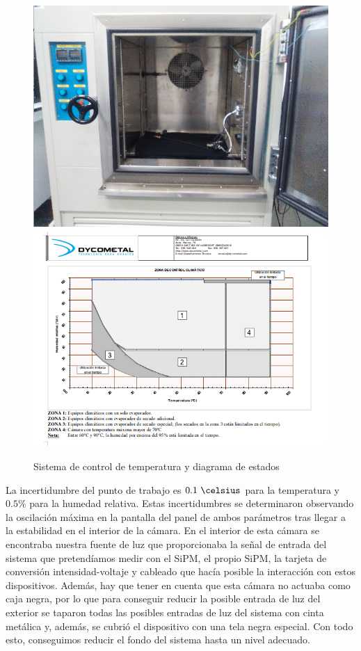 \begin{enumerate}
\begin{figure}[htb]
\centering
{
\includegraphics[scale=0.3]{InteriorTemperatura.png} 
}
{
\includegraphics[scale=0.3]{FichaTecnica.png} 
}
\caption{Sistema de control de temperatura y diagrama de estados~\cite{dycometal}\label{sistematemperatura}}
\end{figure}

La incertidumbre  del punto de trabajo es $0.1~\celsius$ para la temperatura y $0.5\%$ para la humedad relativa. Estas incertidumbres se determinaron observando la oscilación  máxima en la pantalla del panel de ambos parámetros tras llegar a la estabilidad en el interior de la cámara.
En el interior de esta cámara se encontraba nuestra fuente de luz que proporcionaba la señal de entrada del sistema que pretendíamos medir con el SiPM, el propio SiPM, la tarjeta de conversión intensidad-voltaje y cableado que hacía posible la interacción con estos dispositivos. Además, hay que tener en cuenta que esta cámara no actuaba como caja negra, por lo que para conseguir reducir la posible entrada de luz del exterior se taparon todas las posibles entradas de luz del sistema con cinta metálica y, además, se cubrió el dispositivo con una tela negra especial. Con todo esto, conseguimos reducir el fondo del sistema hasta un nivel adecuado.


\end{enumerate}
